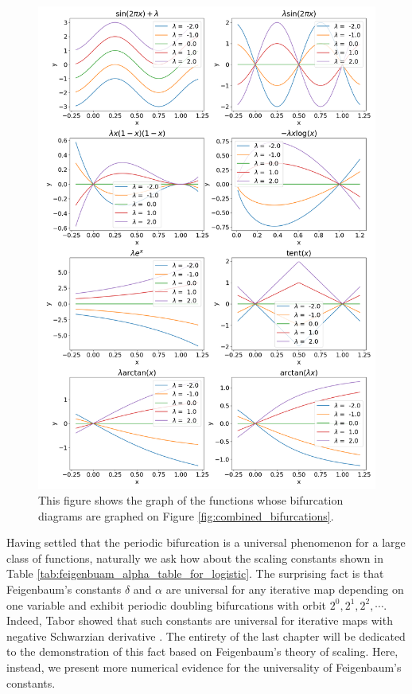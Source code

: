 \begin{figure}
	\centering
	\includegraphics[width=\textwidth]{./figures/combined_functions.png}
	\caption{
		This figure shows the graph of the functions whose bifurcation diagrams are graphed on Figure \ref{fig:combined_bifurcations}.
	}
	\label{fig:combined_bifurcations_functions_graph}
\end{figure}


Having settled that the periodic bifurcation is a universal phenomenon for a large class of functions, naturally we ask how about the scaling constants shown in Table \ref{tab:feigenbuam_alpha_table_for_logistic}.
The surprising fact is that Feigenbaum's constants $\delta$ and $\alpha$ are universal for any iterative map depending on one variable and exhibit periodic doubling bifurcations with orbit $2^0, 2^1, 2^2, \cdots$. 
Indeed, Tabor showed that such constants are universal for iterative maps with negative Schwarzian derivative \cite{Tabor}.
The entirety of the last chapter will be dedicated to the demonstration of this fact based on Feigenbaum's theory of scaling. 
Here, instead, we present more numerical evidence for the universality of Feigenbaum's constants.

